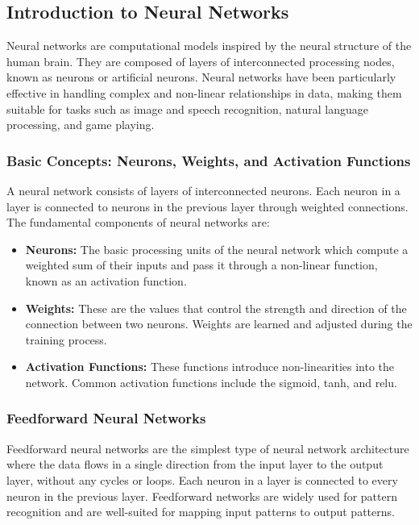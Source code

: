 \subsection{Introduction to Neural Networks}

Neural networks are computational models inspired by the neural structure of the human brain. They are composed of layers of interconnected processing nodes, known as neurons or artificial neurons. Neural networks have been particularly effective in handling complex and non-linear relationships in data, making them suitable for tasks such as image and speech recognition, natural language processing, and game playing.

\subsubsection{Basic Concepts: Neurons, Weights, and Activation Functions}

A neural network consists of layers of interconnected neurons. Each neuron in a layer is connected to neurons in the previous layer through weighted connections. The fundamental components of neural networks are:

\begin{itemize}
    \item \textbf{Neurons:} The basic processing units of the neural network which compute a weighted sum of their inputs and pass it through a non-linear function, known as an activation function.
    
    \item \textbf{Weights:} These are the values that control the strength and direction of the connection between two neurons. Weights are learned and adjusted during the training process.
    
    \item \textbf{Activation Functions:} These functions introduce non-linearities into the network. Common activation functions include the sigmoid, \ac{tanh}, and \ac{relu}.
\end{itemize}

\subsubsection{Feedforward Neural Networks}

Feedforward neural networks are the simplest type of neural network architecture where the data flows in a single direction from the input layer to the output layer, without any cycles or loops. Each neuron in a layer is connected to every neuron in the previous layer. Feedforward networks are widely used for pattern recognition and are well-suited for mapping input patterns to output patterns.

